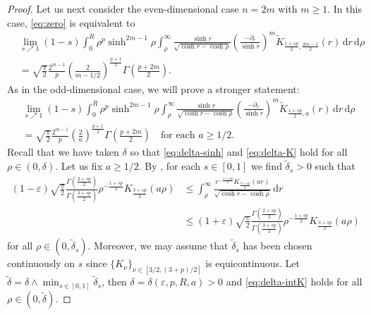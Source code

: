 \documentclass[11pt]{amsart}
\theoremstyle{plain}
\theoremstyle{definition}
\numberwithin{equation}{section}
\begin{document}
\begin{proof}
Let us next consider the even-dimensional case $n = 2m$ with $m \geq 1$. In this case, \eqref{eq:zero} is equivalent to
\begin{equation*}
\begin{split}
&\lim_{s \nearrow 1} (1-s) \int_{0}^{R} \rho^{p} \sinh^{2m-1}\rho \int_{\rho}^{\infty} \frac{\sinh r}{\sqrt{\cosh r - \cosh \rho}} \left( \frac{-\partial_{r}}{\sinh r} \right)^{m} \widetilde{K}_{\frac{1+sp}{2},\frac{2m-1}{2}}(r) \, \mathrm{d}r \,\mathrm{d}\rho \\
&= \sqrt{\frac{\pi}{2}} \frac{2^{m-1}}{p} \left( \frac{2}{m-1/2} \right)^{\frac{p+1}{2}} \Gamma\left(\frac{p+2m}{2} \right).
\end{split}
\end{equation*}
As in the odd-dimensional case, we will prove a stronger statement:
\begin{equation} \label{eq:zero-even}
\begin{split}
&\lim_{s \nearrow 1} (1-s) \int_{0}^{R} \rho^{p} \sinh^{2m-1}\rho \int_{\rho}^{\infty} \frac{\sinh r}{\sqrt{\cosh r - \cosh \rho}} \left( \frac{-\partial_{r}}{\sinh r} \right)^{m} \widetilde{K}_{\frac{1+sp}{2},a}(r) \, \mathrm{d}r \,\mathrm{d}\rho \\
&= \sqrt{\frac{\pi}{2}} \frac{2^{m-1}}{p} \left( \frac{2}{a} \right)^{\frac{p+1}{2}} \Gamma\left(\frac{p+2m}{2} \right) \quad\text{for each } a \geq 1/2.
\end{split}
\end{equation}
Recall that we have taken $\delta$ so that \eqref{eq:delta-sinh} and \eqref{eq:delta-K} hold for all $\rho \in (0, \delta)$. Let us fix $a \geq 1/2$. By , for each $s \in [0,1]$ we find $\tilde{\delta}_{s} > 0$ such that
\begin{equation} \label{eq:delta-intK}
\begin{split}
(1-\varepsilon) \sqrt{\frac{\pi}{2}} \frac{\Gamma(\frac{2+sp}{2})}{\Gamma(\frac{3+sp}{2})} \rho^{-\frac{1+sp}{2}} K_{\frac{3+sp}{2}}(a\rho)
&\leq \int_{\rho}^{\infty} \frac{r^{-\frac{1+sp}{2}} K_{\frac{3+sp}{2}}(ar)}{\sqrt{\cosh r - \cosh \rho}} \, \mathrm{d}r \\
&\leq (1+\varepsilon) \sqrt{\frac{\pi}{2}} \frac{\Gamma(\frac{2+sp}{2})}{\Gamma(\frac{3+sp}{2})} \rho^{-\frac{1+sp}{2}} K_{\frac{3+sp}{2}}(a\rho)
\end{split}
\end{equation}
for all $\rho \in (0, \tilde{\delta}_{s})$. Moreover, we may assume that $\tilde{\delta}_{s}$ has been chosen continuously on $s$ since $\{K_\nu\}_{\nu\in [3/2,(3+p)/2]}$ is equicontinuous. Let $\tilde{\delta} = \delta \land \min_{s \in [0,1]} \tilde{\delta}_{s}$, then $\delta = \delta(\varepsilon, p, R, a) > 0$ and \eqref{eq:delta-intK} holds for all $\rho \in (0, \tilde{\delta})$.


\end{proof}
\end{document}
